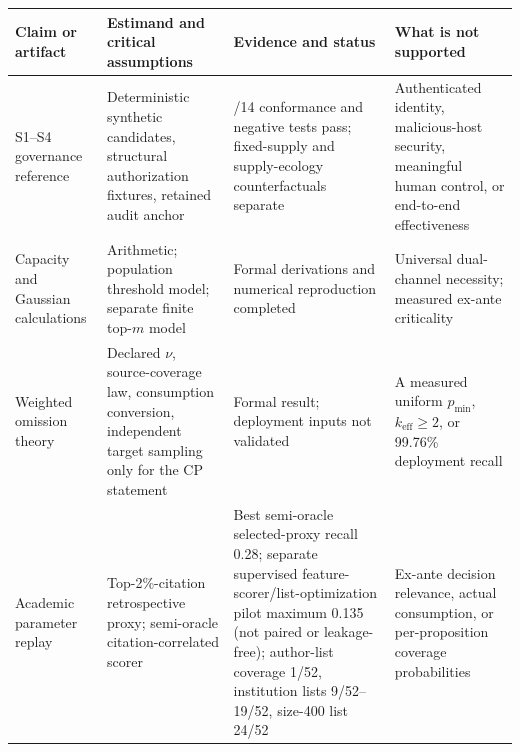 \documentclass[
  11pt]{article}
\begin{document}
\begin{longtable}[]{@{}
  >{\raggedright\arraybackslash}p{}
  >{\raggedright\arraybackslash}p{}
  >{\raggedright\arraybackslash}p{}
  >{\raggedright\arraybackslash}p{}@{}}
\toprule\noalign{}
\begin{minipage}[b]{\linewidth}\raggedright
Claim or artifact
\end{minipage} & \begin{minipage}[b]{\linewidth}\raggedright
Estimand and critical assumptions
\end{minipage} & \begin{minipage}[b]{\linewidth}\raggedright
Evidence and status
\end{minipage} & \begin{minipage}[b]{\linewidth}\raggedright
What is not supported
\end{minipage} \\
\midrule\noalign{}
\endhead
\bottomrule\noalign{}
\endlastfoot
S1--S4 governance reference & Deterministic synthetic candidates,
structural authorization fixtures, retained audit anchor & 14/14
conformance and negative tests pass; fixed-supply and supply-ecology
counterfactuals separate & Authenticated identity, malicious-host
security, meaningful human control, or end-to-end effectiveness \\
Capacity and Gaussian calculations & Arithmetic; population threshold
model; separate finite top-\(m\) model & Formal derivations and
numerical reproduction completed & Universal dual-channel necessity;
measured ex-ante criticality \\
Weighted omission theory & Declared \(\nu\), source-coverage law,
consumption conversion, independent target sampling only for the CP
statement & Formal result; deployment inputs not validated & A measured
uniform \(p_{\min}\), \(k_{\mathrm{eff}}\ge2\), or 99.76\% deployment
recall \\
Academic parameter replay & Top-2\%-citation retrospective proxy;
semi-oracle citation-correlated scorer & Best semi-oracle selected-proxy
recall 0.28; separate supervised feature-scorer/list-optimization pilot
maximum 0.135 (not paired or leakage-free); author-list coverage 1/52,
institution lists 9/52--19/52, size-400 list 24/52 & Ex-ante decision
relevance, actual consumption, or per-proposition coverage
probabilities \\

\end{longtable}
\end{document}
